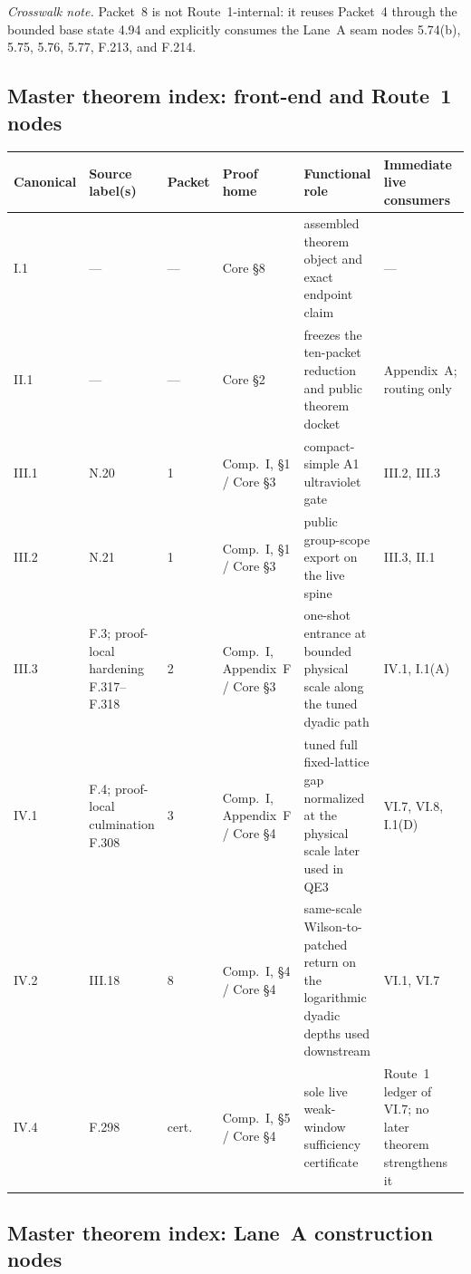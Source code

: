 \smallskip
\noindent\emph{Crosswalk note.} Packet~8 is not Route~1-internal: it reuses Packet~4 through the bounded base state 4.94 and explicitly consumes the Lane~A seam nodes 5.74(b), 5.75, 5.76, 5.77, F.213, and F.214.

\subsection*{Master theorem index: front-end and Route~1 nodes}

\begingroup
\scriptsize
\setlength{\tabcolsep}{3pt}
\noindent\begin{tabular}{@{}p{}p{}p{}p{}p{}p{}@{}}
\toprule
\textbf{Canonical} & \textbf{Source label(s)} & \textbf{Packet} & \textbf{Proof home} & \textbf{Functional role} & \textbf{Immediate live consumers}\\
\midrule
I.1 & --- & --- & Core \S8 & assembled theorem object and exact endpoint claim & ---\\[0.3em]
II.1 & --- & --- & Core \S2 & freezes the ten-packet reduction and public theorem docket & Appendix~A; routing only\\[0.3em]
III.1 & N.20 & 1 & Comp.~I, \S1 / Core \S3 & compact-simple A1 ultraviolet gate & III.2, III.3\\[0.3em]
III.2 & N.21 & 1 & Comp.~I, \S1 / Core \S3 & public group-scope export on the live spine & III.3, II.1\\[0.3em]
III.3 & F.3; proof-local hardening F.317--F.318 & 2 & Comp.~I, Appendix~F / Core \S3 & one-shot entrance at bounded physical scale along the tuned dyadic path & IV.1, I.1(A)\\[0.3em]
IV.1 & F.4; proof-local culmination F.308 & 3 & Comp.~I, Appendix~F / Core \S4 & tuned full fixed-lattice gap normalized at the physical scale later used in QE3 & VI.7, VI.8, I.1(D)\\[0.3em]
IV.2 & III.18 & 8 & Comp.~I, \S4 / Core \S4 & same-scale Wilson-to-patched return on the logarithmic dyadic depths used downstream & VI.1, VI.7\\[0.3em]
IV.4 & F.298 & cert. & Comp.~I, \S5 / Core \S4 & sole live weak-window sufficiency certificate & Route~1 ledger of VI.7; no later theorem strengthens it\\
\bottomrule
\end{tabular}
\endgroup

\subsection*{Master theorem index: Lane~A construction nodes}

